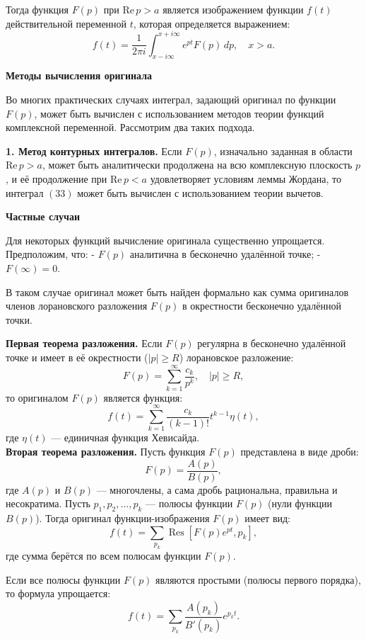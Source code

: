 {Тогда функция \(F(p)\) при \(\mathrm{Re}\,p > a\) является изображением функции \(f(t)\) действительной переменной \(t\), которая определяется выражением:
\[
f(t) = \frac{1}{2\pi i} \int_{x-i\infty}^{x+i\infty} e^{pt} F(p) \, dp, \quad x > a.
\]

\textbf{Методы вычисления оригинала}

Во многих практических случаях интеграл, задающий оригинал по функции \(F(p)\), может быть вычислен с использованием методов теории функций комплексной переменной. Рассмотрим два таких подхода.

\textbf{1. Метод контурных интегралов.}  
Если \(F(p)\), изначально заданная в области \(\mathrm{Re}\,p > a\), может быть аналитически продолжена на всю комплексную плоскость \(p\), и её продолжение при \(\mathrm{Re}\,p < a\) удовлетворяет условиям леммы Жордана, то интеграл \((33)\) может быть вычислен с использованием теории вычетов.

\textbf{Частные случаи}

Для некоторых функций вычисление оригинала существенно упрощается. Предположим, что:
- \(F(p)\) аналитична в бесконечно удалённой точке;
- \(F(\infty) = 0\).

В таком случае оригинал может быть найден формально как сумма оригиналов членов лорановского разложения \(F(p)\) в окрестности бесконечно удалённой точки.

\textbf{Первая теорема разложения.}  
Если \(F(p)\) регулярна в бесконечно удалённой точке и имеет в её окрестности (\(|p| \geq R\)) лорановское разложение:
\[
F(p) = \sum_{k=1}^\infty \frac{c_k}{p^k}, \quad |p| \geq R, 
\]
то оригиналом \(F(p)\) является функция:
\[
f(t) = \sum_{k=1}^\infty \frac{c_k}{(k-1)!} t^{k-1} \eta(t), 
\]
где \(\eta(t)\) — единичная функция Хевисайда.\\
\textbf{Вторая теорема разложения.}  
Пусть функция \(F(p)\) представлена в виде дроби:
\[
F(p) = \frac{A(p)}{B(p)}, 
\]
где \(A(p)\) и \(B(p)\) — многочлены, а сама дробь рациональна, правильна и несократима. Пусть \(p_1, p_2, \dots, p_k\) — полюсы функции \(F(p)\) (нули функции \(B(p)\)). Тогда оригинал функции-изображения \(F(p)\) имеет вид:
\[
f(t) = \sum_{p_k} \operatorname{Res} \left[ F(p) e^{p t}, p_k \right], 
\]
где сумма берётся по всем полюсам функции \(F(p)\).

Если все полюсы функции \(F(p)\) являются простыми (полюсы первого порядка), то формула упрощается:
\[
f(t) = \sum_{p_k} \frac{A(p_k)}{B'(p_k)} e^{p_k t}.
\]

}

